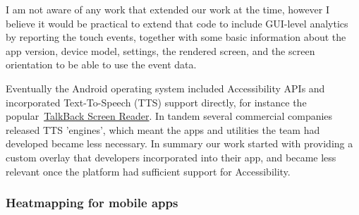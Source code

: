 I am not aware of any work that extended our work at the time, however I believe it would be practical to extend that code to include GUI-level analytics by reporting the touch events, together with some basic information about the app version, device model, settings, the rendered screen, and the screen orientation to be able to use the event data.

Eventually the Android operating system included Accessibility APIs and incorporated Text-To-Speech (TTS) support directly, for instance the popular~\href{https://support.google.com/accessibility/android/answer/6283677?hl=en}{TalkBack Screen Reader}. In tandem several commercial companies released TTS 'engines', which meant the apps and utilities the team had developed became less necessary. In summary our work started with providing a custom overlay that developers incorporated into their app, and became less relevant once the platform had sufficient support for Accessibility.


\subsubsection{Heatmapping for mobile apps}

